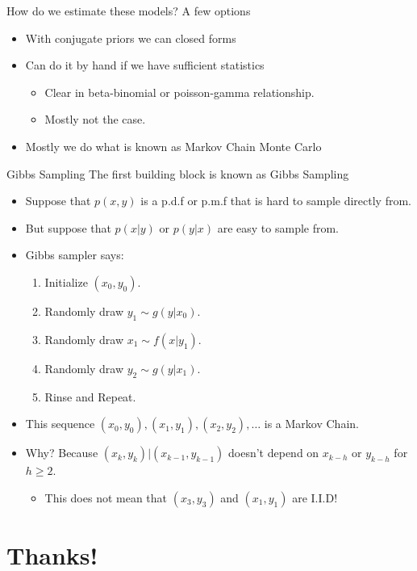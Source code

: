 \documentclass[aspectratio=169]{beamer}
\begin{document}
\begin{frame}{How do we estimate these models?}
A few options
\begin{itemize}
\item With conjugate priors we can closed forms
\item Can do it by hand if we have \alert{sufficient statistics}
\begin{itemize}
\item Clear in beta-binomial or poisson-gamma relationship.
\item Mostly not the case.
\end{itemize}
\item Mostly we do what is known as \alert{Markov Chain Monte Carlo}
\end{itemize}
\end{frame}


\begin{frame}{Gibbs Sampling}
The first building block is known as \alert{Gibbs Sampling}
\begin{itemize}
\item Suppose that $p(x,y)$ is a p.d.f or p.m.f that is hard to sample directly from.
\item But suppose that $p(x | y)$ or $p(y | x)$ are easy to sample from.
\item Gibbs sampler says:
\begin{enumerate}
\item Initialize $(x_0,y_0)$.
\item Randomly draw $y_1 \sim g(y | x_0)$.
\item Randomly draw $x_1 \sim f(x | y_1)$.
\item Randomly draw $y_2 \sim g(y | x_1)$.
\item Rinse and Repeat. 
\end{enumerate}
\item This sequence $(x_0,y_0),(x_1,y_1), (x_2,y_2), \ldots$ is a \alert{Markov Chain}.
\item Why? Because $(x_k,y_k) | (x_{k-1},y_{k-1})$ doesn't depend on $x_{k-h}$ or $y_{k-h}$ for $h \geq 2$.
\begin{itemize}
\item This does not mean that $(x_3,y_3)$ and $(x_1,y_1)$ are I.I.D!
\end{itemize}

\end{itemize}

\end{frame}


\section*{Thanks!}
\end{document}

